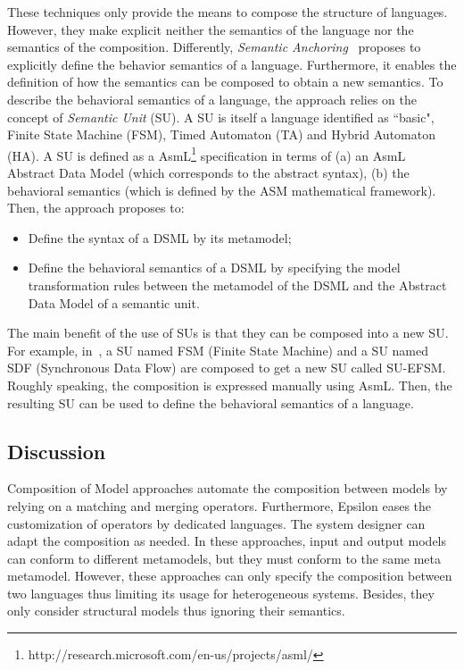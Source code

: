 These techniques only provide the means to compose the structure of languages. However, they make explicit neither the semantics of the language nor the semantics of the composition. Differently, \emph{Semantic Anchoring}~\cite{semanticsanchoring} proposes to explicitly define the behavior semantics of a language. Furthermore, it enables the definition of how the semantics can be composed to obtain a new semantics. To describe the behavioral semantics of a language, the approach relies on the concept of \emph{Semantic Unit} (SU). A SU is itself a language identified as ``basic", \eg Finite State Machine (FSM), Timed Automaton (TA) and Hybrid Automaton (HA). A SU is defined as a AsmL\footnote{http://research.microsoft.com/en-us/projects/asml/} specification in terms of (a) an AsmL Abstract Data Model (which corresponds to the abstract syntax), (b) the behavioral semantics (which is defined by the ASM mathematical framework). Then, the approach proposes to:
\begin{itemize}
	\item Define the syntax of a DSML by its metamodel;
	\item Define the behavioral semantics of a DSML by specifying the model transformation rules between the metamodel of the DSML and the Abstract Data Model of a semantic unit. 
\end{itemize}    
The main benefit of the use of SUs is that they can be composed into a new SU. For example, in~\cite{composemanticanch}, a SU named FSM (Finite State Machine) and a SU named SDF (Synchronous Data Flow) are composed to get a new SU called SU-EFSM. Roughly speaking, the composition is expressed manually using AsmL. Then, the resulting SU can be used to define the behavioral semantics of a language.

\subsection{Discussion}
Composition of Model approaches automate the composition between models by relying on a matching and merging operators. Furthermore, Epsilon eases the customization of operators by dedicated languages. The system designer can adapt the composition as needed. In these approaches, input and output models can conform to different metamodels, but they must conform to the same meta metamodel. However, these approaches can only specify the composition between two languages thus limiting its usage for heterogeneous systems. Besides, they only consider structural models thus ignoring their semantics.     

